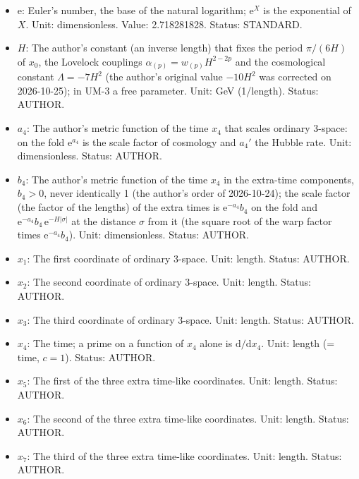 \documentclass[
  10pt,
]{article}
\begin{document}
\begin{itemize}
  \(\mathrm{d}\sigma = \lvert\cot z\rvert\,\mathrm{d}x_0\),
  \(\sigma = \mathrm{sgn}(\pi/2 - z)\ln(\sin z)/(6H)\) on one period
  \(0 < z < \pi\); \(\sigma = 0\) is the fold \(z = \pi/2\),
  \(\sigma \to \mp\infty\) the tips \(z \to 0, \pi\); one period of
  \(x_0\) is the whole line \(-\infty < \sigma < \infty\). Unit: length.
  Status: DERIVED.
\item
  \(\mathrm{e}\): Euler's number, the base of the natural logarithm;
  \(\mathrm{e}^{X}\) is the exponential of \(X\). Unit: dimensionless.
  Value: 2.718281828. Status: STANDARD.
\item
  \(H\): The author's constant (an inverse length) that fixes the period
  \(\pi/(6H)\) of \(x_0\), the Lovelock couplings
  \(\alpha_{(p)} = w_{(p)}H^{2-2p}\) and the cosmological constant
  \(\Lambda = -7H^2\) (the author's original value \(-10H^2\) was
  corrected on 2026-10-25); in UM-3 a free parameter. Unit: GeV
  (1/length). Status: AUTHOR.
\item
  \(a_4\): The author's metric function of the time \(x_4\) that scales
  ordinary 3-space: on the fold \(\mathrm{e}^{a_4}\) is the scale factor
  of cosmology and \(a_4'\) the Hubble rate. Unit: dimensionless.
  Status: AUTHOR.
\item
  \(b_4\): The author's metric function of the time \(x_4\) in the
  extra-time components, \(b_4 > 0\), never identically 1 (the author's
  order of 2026-10-24); the scale factor (the factor of the lengths) of
  the extra times is \(\mathrm{e}^{-a_4}b_4\) on the fold and
  \(\mathrm{e}^{-a_4}b_4\,\mathrm{e}^{-H\lvert\sigma\rvert}\) at the
  distance \(\sigma\) from it (the square root of the warp factor times
  \(\mathrm{e}^{-a_4}b_4\)). Unit: dimensionless. Status: AUTHOR.
\item
  \(x_1\): The first coordinate of ordinary 3-space. Unit: length.
  Status: AUTHOR.
\item
  \(x_2\): The second coordinate of ordinary 3-space. Unit: length.
  Status: AUTHOR.
\item
  \(x_3\): The third coordinate of ordinary 3-space. Unit: length.
  Status: AUTHOR.
\item
  \(x_4\): The time; a prime on a function of \(x_4\) alone is
  \(\mathrm{d}/\mathrm{d}x_4\). Unit: length (= time, \(c = 1\)).
  Status: AUTHOR.
\item
  \(x_5\): The first of the three extra time-like coordinates. Unit:
  length. Status: AUTHOR.
\item
  \(x_6\): The second of the three extra time-like coordinates. Unit:
  length. Status: AUTHOR.
\item
  \(x_7\): The third of the three extra time-like coordinates. Unit:
  length. Status: AUTHOR.
\end{itemize}
\end{document}
